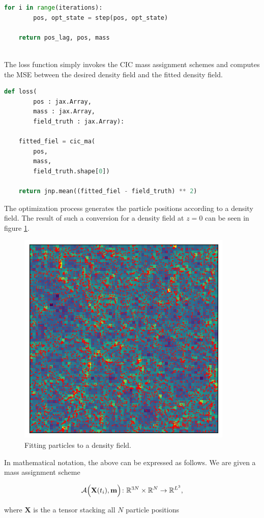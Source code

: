 \documentclass{article}
\begin{document}
{\begin{appendices}
\begin{lstlisting}[language=Python]
    for i in range(iterations):
        pos, opt_state = step(pos, opt_state)

    return pos_lag, pos, mass
        
\end{lstlisting}

The loss function simply invokes the CIC mass assignment schemes and computes the MSE between the desired density field and the fitted density field.

\begin{lstlisting}[language=Python]
def loss(
        pos : jax.Array,
        mass : jax.Array,
        field_truth : jax.Array):
    
    fitted_fiel = cic_ma(
        pos,
        mass,
        field_truth.shape[0])
    
    return jnp.mean((fitted_fiel - field_truth) ** 2)
\end{lstlisting}

The optimization process generates the particle positions according to a density field. The result of such a conversion for a density field at $z=0$ can be seen in figure \ref{fig:cosmax-fit}.

\begin{figure}[h]
    \centering
    \includegraphics[width=0.5\linewidth]{img/fit.png}
    \caption{Fitting particles to a density field.}
    \label{fig:cosmax-fit}
\end{figure}

In mathematical notation, the above can be expressed as follows. We are given a mass assignment scheme 

\begin{equation}
    \mathcal{A}\Bigl(\mathbf{X}(t_i), \mathbf{m}\Bigr) \colon \mathbb{R}^{3N} \times \mathbb{R}^{N} \rightarrow \mathbb{R}^{L^3},
\end{equation}

where $\mathbf{X}$ is the a tensor stacking all $N$ particle positions


\end{appendices}}
\end{document}

